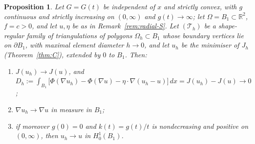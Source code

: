 \documentclass[11pt]{amsart}
\newtheorem{proposition}[theorem]{Proposition}
\theoremstyle{definition}
\theoremstyle{remark}
\numberwithin{equation}{section}
\newcommand{\R}{\mathbb{R}}
\newcommand{\dx}{\,dx}
\begin{document}
\begin{proposition}\label{prop:uh-conv}
Let $G=G(t)$ be independent of $x$ and strictly convex, with $g$ continuous and strictly increasing on $(0,\infty)$ and $g(t)\to\infty$; let $\Omega=B_1\subset\R^2$, $f=c>0$, and let $u,\eta$ be as in Remark~\ref{rem:radial-S}. Let $(\mathcal T_h)$ be a shape-regular family of triangulations of polygons $\Omega_h\subset B_1$ whose boundary vertices lie on $\partial B_1$, with maximal element diameter $h\to0$, and let $u_h$ be the minimiser of $J_h$ \textup(Theorem~\ref{thm:C}\textup), extended by $0$ to $B_1$. Then:
\begin{enumerate}[label=\textup{(\roman*)}]
\item $J(u_h)\to J(u)$, and $D_h:=\int_{B_1}\big[\Phi(\nabla u_h)-\Phi(\nabla u)-\eta\cdot\nabla(u_h-u)\big]\dx=J(u_h)-J(u)\to0$;
\item $\nabla u_h\to\nabla u$ in measure in $B_1$;
\item if moreover $g(0)=0$ and $k(t)=g(t)/t$ is nondecreasing and positive on $(0,\infty)$, then $u_h\to u$ in $H^1_0(B_1)$.
\end{enumerate}
\end{proposition}
\end{document}
